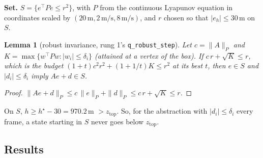 \documentclass[11pt]{article}
\newtheorem{lemma}[theorem]{Lemma}
\newcommand{\zTop}{z_{\mathrm{top}}}
\begin{document}
\textbf{Set.} $S = \{e^\top P e \le r^2\}$, with $P$ from the continuous Lyapunov equation in coordinates scaled by $(20\,\mathrm{m}, 2\,\mathrm{m/s}, 8\,\mathrm{m/s})$, and $r$ chosen so that $|e_h| \le 30$\,m on $S$.

\begin{lemma}[robust invariance, rung 1's \texttt{q\_robust\_step}]\label{lem:absinv}
Let $c = \|A\|_P$ and $K = \max\{w^\top P w : |w_i| \le \delta_i\}$ (attained at a vertex of the box). If $c\,r + \sqrt{K} \le r$, which is the budget $(1+t)c^2r^2 + (1+1/t)K \le r^2$ at its best $t$, then $e \in S$ and $|d_i| \le \delta_i$ imply $Ae + d \in S$.
\end{lemma}
\begin{proof}
$\|Ae + d\|_P \le c\,\|e\|_P + \|d\|_P \le c\,r + \sqrt{K} \le r$.
\end{proof}

On $S$, $h \ge h^\star - 30 = 970.2$\,m $> \zTop$. So, for the abstraction with $|d_i| \le \delta_i$ every frame, a state starting in $S$ never goes below $\zTop$.

\subsection{Results}
\end{document}
